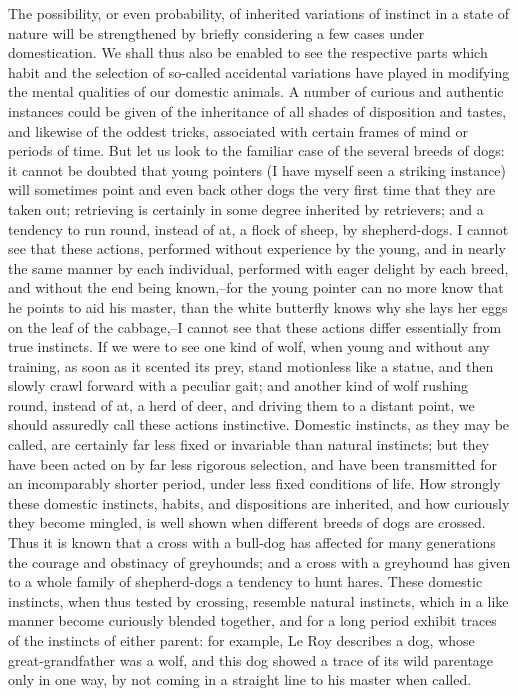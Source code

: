 The possibility, or even probability, of inherited variations of instinct in a state of nature will be strengthened by briefly considering a few cases under domestication. We shall thus also be enabled to see the respective parts which habit and the selection of so-called accidental variations have played in modifying the mental qualities of our domestic animals. A number of curious and authentic instances could be given of the inheritance of all shades of disposition and tastes, and likewise of the oddest tricks, associated with certain frames of mind or periods of time. But let us look to the familiar case of the several breeds of dogs: it cannot be doubted that young pointers (I have myself seen a striking instance) will sometimes point and even back other dogs the very first time that they are taken out; retrieving is certainly in some degree inherited by retrievers; and a tendency to run round, instead of at, a flock of sheep, by shepherd-dogs. I cannot see that these actions, performed without experience by the young, and in nearly the same manner by each individual, performed with eager delight by each breed, and without the end being known,--for the young pointer can no more know that he points to aid his master, than the white butterfly knows why she lays her eggs on the leaf of the cabbage,--I cannot see that these actions differ essentially from true instincts. If we were to see one kind of wolf, when young and without any training, as soon as it scented its prey, stand motionless like a statue, and then slowly crawl forward with a peculiar gait; and another kind of wolf rushing round, instead of at, a herd of deer, and driving them to a distant point, we should assuredly call these actions instinctive. Domestic instincts, as they may be called, are certainly far less fixed or invariable than natural instincts; but they have been acted on by far less rigorous selection, and have been transmitted for an incomparably shorter period, under less fixed conditions of life.
How strongly these domestic instincts, habits, and dispositions are inherited, and how curiously they become mingled, is well shown when different breeds of dogs are crossed. Thus it is known that a cross with a bull-dog has affected for many generations the courage and obstinacy of greyhounds; and a cross with a greyhound has given to a whole family of shepherd-dogs a tendency to hunt hares. These domestic instincts, when thus tested by crossing, resemble natural instincts, which in a like manner become curiously blended together, and for a long period exhibit traces of the instincts of either parent: for example, Le Roy describes a dog, whose great-grandfather was a wolf, and this dog showed a trace of its wild parentage only in one way, by not coming in a straight line to his master when called.
